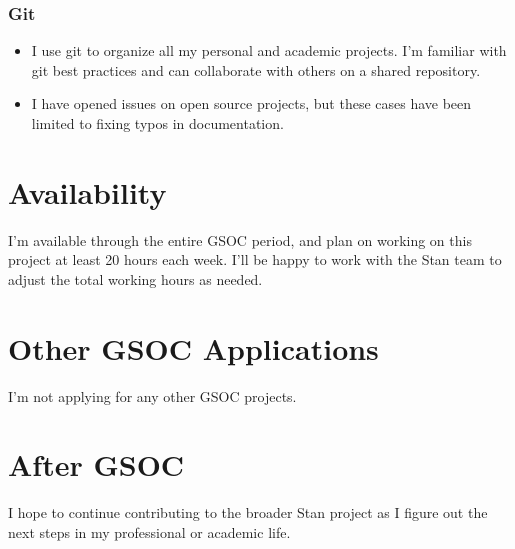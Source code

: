 \documentclass[
  letterpaper,
  DIV=11,
  numbers=noendperiod]{scrartcl}
\begin{document}
\subsubsection{Git}\label{git}

\begin{itemize}
\item
  I use git to organize all my personal and academic projects. I'm
  familiar with git best practices and can collaborate with others on a
  shared repository.
\item
  I have opened issues on open source projects, but these cases have
  been limited to fixing typos in documentation.
\end{itemize}

\section{Availability}\label{availability}

I'm available through the entire GSOC period, and plan on working on
this project at least 20 hours each week. I'll be happy to work with the
Stan team to adjust the total working hours as needed.

\section{Other GSOC Applications}\label{other-gsoc-applications}

I'm not applying for any other GSOC projects.

\section{After GSOC}\label{after-gsoc}

I hope to continue contributing to the broader Stan project as I figure
out the next steps in my professional or academic life.
\end{document}
